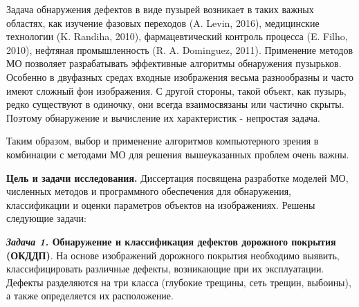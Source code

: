 Задача обнаружения дефектов в виде пузырей возникает в таких важных областях, как изучение фазовых переходов (A. Levin, 2016), медицинские технологии (K. Randiha, 2010), фармацевтический контроль процесса (E. Filho, 2010), нефтяная промышленность (R. A. Dominguez, 2011). Применение методов МО позволяет разрабатывать эффективные алгоритмы обнаружения пузырьков. Особенно в двуфазных средах входные изображения весьма разнообразны и часто имеют сложный фон изображения. С другой стороны, такой объект, как пузырь, редко существуют в одиночку, они всегда взаимосвязаны или частично скрыты. Поэтому обнаружение и вычисление их характеристик - непростая задача.

Таким образом, выбор и применение алгоритмов компьютерного зрения в комбинации с методами МО для решения вышеуказанных проблем очень важны.


\textbf{Цель и задачи исследования.} Диссертация посвящена разработке моделей МО, численных методов и программного обеспечения для обнаружения, классификации и оценки параметров объектов на изображениях. Решены следующие задачи:\vspace{0.5em}

\noindent\textbf{\textit{Задача 1.} Обнаружение и классификация дефектов дорожного покрытия (ОКДДП)}. На основе изображений дорожного покрытия необходимо выявить, классифицировать различные дефекты, возникающие при их эксплуатации. Дефекты разделяются на три класса (глубокие трещины, сеть трещин, выбоины), а также определяется их расположение.\vspace{0.5em}

